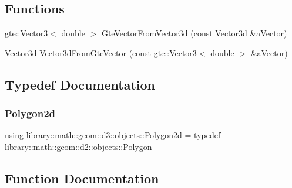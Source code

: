 \subsection*{Functions}
\begin{DoxyCompactItemize}
\item 
gte\+::\+Vector3$<$ double $>$ \hyperlink{namespacelibrary_1_1math_1_1geom_1_1d3_1_1objects_ab253aeb9c4d372b3379e95e15711a98f}{Gte\+Vector\+From\+Vector3d} (const Vector3d \&a\+Vector)
\item 
Vector3d \hyperlink{namespacelibrary_1_1math_1_1geom_1_1d3_1_1objects_a17fdd18d6c2bcacf17c9c1716f99609c}{Vector3d\+From\+Gte\+Vector} (const gte\+::\+Vector3$<$ double $>$ \&a\+Vector)
\end{DoxyCompactItemize}


\subsection{Typedef Documentation}
\mbox{\label{namespacelibrary_1_1math_1_1geom_1_1d3_1_1objects_ae339035ccf9a6f4f0d2945fdcfd76f95}} 
\subsubsection{\texorpdfstring{Polygon2d}{Polygon2d}}
{\footnotesize\ttfamily using \hyperlink{namespacelibrary_1_1math_1_1geom_1_1d3_1_1objects_ae339035ccf9a6f4f0d2945fdcfd76f95}{library\+::math\+::geom\+::d3\+::objects\+::\+Polygon2d} = typedef \hyperlink{classlibrary_1_1math_1_1geom_1_1d2_1_1objects_1_1_polygon}{library\+::math\+::geom\+::d2\+::objects\+::\+Polygon}}



\subsection{Function Documentation}
\mbox{\label{namespacelibrary_1_1math_1_1geom_1_1d3_1_1objects_ab253aeb9c4d372b3379e95e15711a98f}} 
